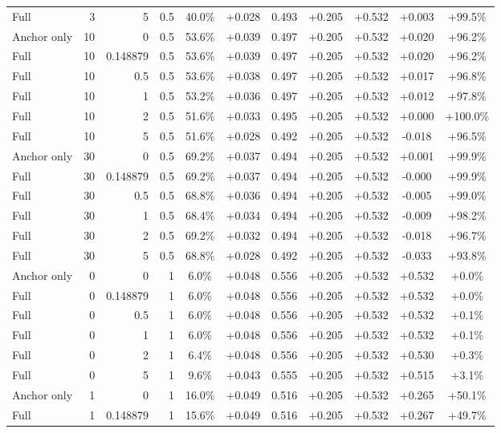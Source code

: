 \begin{table}[htbp]
\begin{tabular}{lrrrccccccc}
Full & 3 & 5 & 0.5 & 40.0\% & +0.028 & 0.493 & +0.205 & +0.532 & +0.003 & +99.5\% \\
Anchor only & 10 & 0 & 0.5 & 53.6\% & +0.039 & 0.497 & +0.205 & +0.532 & +0.020 & +96.2\% \\
Full & 10 & 0.148879 & 0.5 & 53.6\% & +0.039 & 0.497 & +0.205 & +0.532 & +0.020 & +96.2\% \\
Full & 10 & 0.5 & 0.5 & 53.6\% & +0.038 & 0.497 & +0.205 & +0.532 & +0.017 & +96.8\% \\
Full & 10 & 1 & 0.5 & 53.2\% & +0.036 & 0.497 & +0.205 & +0.532 & +0.012 & +97.8\% \\
Full & 10 & 2 & 0.5 & 51.6\% & +0.033 & 0.495 & +0.205 & +0.532 & +0.000 & +100.0\% \\
Full & 10 & 5 & 0.5 & 51.6\% & +0.028 & 0.492 & +0.205 & +0.532 & -0.018 & +96.5\% \\
Anchor only & 30 & 0 & 0.5 & 69.2\% & +0.037 & 0.494 & +0.205 & +0.532 & +0.001 & +99.9\% \\
Full & 30 & 0.148879 & 0.5 & 69.2\% & +0.037 & 0.494 & +0.205 & +0.532 & -0.000 & +99.9\% \\
Full & 30 & 0.5 & 0.5 & 68.8\% & +0.036 & 0.494 & +0.205 & +0.532 & -0.005 & +99.0\% \\
Full & 30 & 1 & 0.5 & 68.4\% & +0.034 & 0.494 & +0.205 & +0.532 & -0.009 & +98.2\% \\
Full & 30 & 2 & 0.5 & 69.2\% & +0.032 & 0.494 & +0.205 & +0.532 & -0.018 & +96.7\% \\
Full & 30 & 5 & 0.5 & 68.8\% & +0.028 & 0.492 & +0.205 & +0.532 & -0.033 & +93.8\% \\
Anchor only & 0 & 0 & 1 & 6.0\% & +0.048 & 0.556 & +0.205 & +0.532 & +0.532 & +0.0\% \\
Full & 0 & 0.148879 & 1 & 6.0\% & +0.048 & 0.556 & +0.205 & +0.532 & +0.532 & +0.0\% \\
Full & 0 & 0.5 & 1 & 6.0\% & +0.048 & 0.556 & +0.205 & +0.532 & +0.532 & +0.1\% \\
Full & 0 & 1 & 1 & 6.0\% & +0.048 & 0.556 & +0.205 & +0.532 & +0.532 & +0.1\% \\
Full & 0 & 2 & 1 & 6.4\% & +0.048 & 0.556 & +0.205 & +0.532 & +0.530 & +0.3\% \\
Full & 0 & 5 & 1 & 9.6\% & +0.043 & 0.555 & +0.205 & +0.532 & +0.515 & +3.1\% \\
Anchor only & 1 & 0 & 1 & 16.0\% & +0.049 & 0.516 & +0.205 & +0.532 & +0.265 & +50.1\% \\
Full & 1 & 0.148879 & 1 & 15.6\% & +0.049 & 0.516 & +0.205 & +0.532 & +0.267 & +49.7\% \\

\end{tabular}
\end{table}
